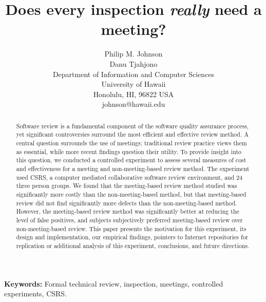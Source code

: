 





\title{{\bf Does every inspection {\em really} need a meeting?}}

\author{
        Philip M. Johnson\\ 
        Danu Tjahjono\\
        Department of Information and Computer Sciences\\
        University of Hawaii\\
        Honolulu, HI, 96822 USA\\
        johnson@hawaii.edu
      }

\maketitle


{\bf Keywords: } Formal technical review, inspection, meetings, controlled
experiments, CSRS.

\begin{abstract}
  
  Software review is a fundamental component of the software quality
  assurance process, yet significant controversies surround the most
  efficient and effective review method. A central question surrounds the
  use of meetings; traditional review practice views them as essential,
  while more recent findings question their utility.  To provide insight
  into this question, we conducted a controlled experiment to
  assess several measures of cost and effectiveness for a meeting and
  non-meeting-based review method.  The experiment used CSRS, a computer
  mediated collaborative software review environment, and 24 three person
  groups.  We found that the meeting-based review method studied was
  significantly more costly than the non-meeting-based method, but that
  meeting-based review did not find significantly more defects than the
  non-meeting-based method. However, the meeting-based review method was
  significantly better at reducing the level of false positives, and
  subjects subjectively preferred meeting-based review over
  non-meeting-based review.  This paper presents the motivation for this
  experiment, its design and implementation, our empirical findings,
  pointers to Internet repositories for replication or additional analysis
  of this experiment, conclusions, and future directions.

\end{abstract}

